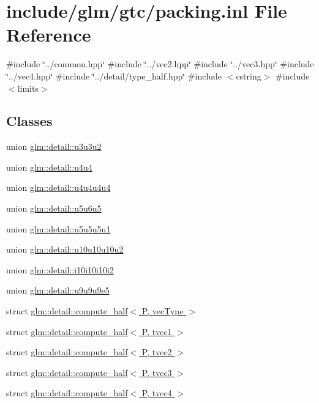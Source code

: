 \hypertarget{packing_8inl}{}\section{include/glm/gtc/packing.inl File Reference}
\label{packing_8inl}
{\ttfamily \#include \char`\"{}../common.\+hpp\char`\"{}}\newline
{\ttfamily \#include \char`\"{}../vec2.\+hpp\char`\"{}}\newline
{\ttfamily \#include \char`\"{}../vec3.\+hpp\char`\"{}}\newline
{\ttfamily \#include \char`\"{}../vec4.\+hpp\char`\"{}}\newline
{\ttfamily \#include \char`\"{}../detail/type\+\_\+half.\+hpp\char`\"{}}\newline
{\ttfamily \#include $<$cstring$>$}\newline
{\ttfamily \#include $<$limits$>$}\newline
\subsection*{Classes}
\begin{DoxyCompactItemize}
\item 
union \hyperlink{unionglm_1_1detail_1_1u3u3u2}{glm\+::detail\+::u3u3u2}
\item 
union \hyperlink{unionglm_1_1detail_1_1u4u4}{glm\+::detail\+::u4u4}
\item 
union \hyperlink{unionglm_1_1detail_1_1u4u4u4u4}{glm\+::detail\+::u4u4u4u4}
\item 
union \hyperlink{unionglm_1_1detail_1_1u5u6u5}{glm\+::detail\+::u5u6u5}
\item 
union \hyperlink{unionglm_1_1detail_1_1u5u5u5u1}{glm\+::detail\+::u5u5u5u1}
\item 
union \hyperlink{unionglm_1_1detail_1_1u10u10u10u2}{glm\+::detail\+::u10u10u10u2}
\item 
union \hyperlink{unionglm_1_1detail_1_1i10i10i10i2}{glm\+::detail\+::i10i10i10i2}
\item 
union \hyperlink{unionglm_1_1detail_1_1u9u9u9e5}{glm\+::detail\+::u9u9u9e5}
\item 
struct \hyperlink{structglm_1_1detail_1_1compute__half}{glm\+::detail\+::compute\+\_\+half$<$ P, vec\+Type $>$}
\item 
struct \hyperlink{structglm_1_1detail_1_1compute__half_3_01P_00_01tvec1_01_4}{glm\+::detail\+::compute\+\_\+half$<$ P, tvec1 $>$}
\item 
struct \hyperlink{structglm_1_1detail_1_1compute__half_3_01P_00_01tvec2_01_4}{glm\+::detail\+::compute\+\_\+half$<$ P, tvec2 $>$}
\item 
struct \hyperlink{structglm_1_1detail_1_1compute__half_3_01P_00_01tvec3_01_4}{glm\+::detail\+::compute\+\_\+half$<$ P, tvec3 $>$}
\item 
struct \hyperlink{structglm_1_1detail_1_1compute__half_3_01P_00_01tvec4_01_4}{glm\+::detail\+::compute\+\_\+half$<$ P, tvec4 $>$}
\end{DoxyCompactItemize}
